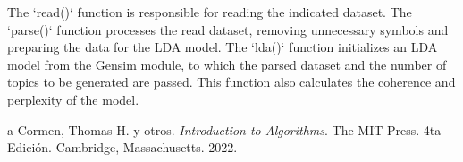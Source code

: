 \documentclass[10pt]{article} %
\begin{document}
	The `read()` function is responsible for reading the indicated dataset. The `parse()` function processes the read dataset, removing unnecessary symbols and preparing the data for the LDA model. The `lda()` function initializes an LDA model from the Gensim module, to which the parsed dataset and the number of topics to be generated are passed. This function also calculates the coherence and perplexity of the model.
	
	
	\begin{thebibliography}
		a
		 Cormen, Thomas H. y otros. \emph{Introduction to Algorithms}. 
		The MIT Press.
		4ta Edici\'on.		
		Cambridge, Massachusetts.
		2022.
	\end{thebibliography}
\end{document}

